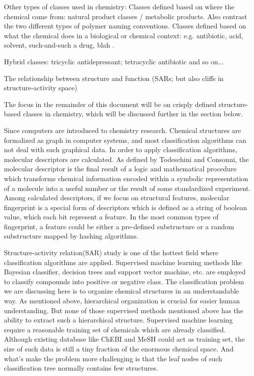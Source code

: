 \documentclass[10pt]{bmc_article}
\newenvironment{bmcformat}{\baselineskip20pt\sloppy\setboolean{publ}{false}}{\baselineskip20pt\sloppy}
\begin{document}
\begin{bmcformat}
Other types of classes used in chemistry:  %
Classes defined based on where the chemical came from:  natural product classes / metabolic products.  Also contrast the two different types of polymer naming conventions. 
Classes defined based on what the chemical does in a biological or chemical context: e.g. antibiotic, acid, solvent, such-and-such a drug, blah \cite{batchelor2011}. %

Hybrid classes:  tricyclic antidepressant; tetracyclic antibiotic and so on...

The relationship between structure and function (SARs; but also cliffs in structure-activity space)

The focus in the remainder of this document will be on crisply defined structure-based classes in chemistry, which will be discussed further in the section \textit{} below. %


Since computers are introduced to chemistry research. Chemical structures are formalized as graph in computer systems, and most classification algorithms can not deal with such graphical data. In order to apply classification algorithms, molecular descriptors are calculated. As defined by Todeschini and Consonni\cite{Todeschini2000}, the molecular descriptor is the final result of a logic and mathematical procedure which transforms chemical information encoded within a symbolic representation of a molecule into a useful number or the result of some standardized experiment. Among calculated descriptors, if we focus on structural features, molecular fingerprint is a special form of descriptors which is defined as a string of boolean value, which each bit represent a feature. In the most common types of fingerprint, a feature could be either a pre-defined substructure or a random substructure mapped by hashing algorithms.

Structure-activity relation(SAR) study is one of the hottest field where classification algorithms are applied. Supervised machine learning methods like Bayesian classifier, decision trees and support vector machine, etc. are employed to classify compounds into positive or negative class. The classification problem we are discussing here is to organize chemical structures in an understandable way. As mentioned above, hierarchical organization is crucial for easier human understanding. But none of those supervised methods mentioned above has the ability to extract such a hierarchical structure. Supervised machine learning require a reasonable training set of chemicals which are already classified. Although existing database like ChEBI and MeSH could act as training set, the size of such data is still a tiny fraction of the enormous chemical space. And what's make the problem more challenging is that the leaf nodes of such classification tree normally contains few structures. 


\end{bmcformat}
\end{document}
